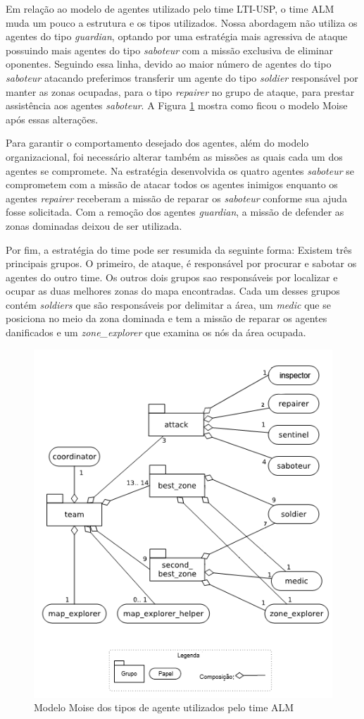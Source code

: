 \documentclass{llncs}
\begin{document}
Em relação ao modelo de agentes utilizado pelo time LTI-USP, o time ALM muda um pouco a estrutura e os tipos utilizados. Nossa abordagem não utiliza os agentes do tipo \textit{guardian}, optando por uma estratégia mais agressiva de ataque possuindo mais agentes do tipo \textit{saboteur} com a missão exclusiva de eliminar oponentes. Seguindo essa linha, devido ao maior número de agentes do tipo \textit{saboteur} atacando preferimos transferir um agente do tipo \textit{soldier} responsável por manter as zonas ocupadas, para o tipo \textit{repairer} no grupo de ataque, para prestar assistência aos agentes \textit{saboteur}. A Figura \ref{fig:fig2} mostra como ficou o modelo Moise após essas alterações.

Para garantir o comportamento desejado dos agentes, além do modelo organizacional, foi necessário alterar também as missões as quais cada um dos agentes se compromete. Na estratégia desenvolvida os quatro agentes \textit{saboteur} se comprometem com a missão de atacar todos os agentes inimigos enquanto os agentes \textit{repairer} receberam a missão de reparar os \textit{saboteur} conforme sua ajuda fosse solicitada. Com a remoção dos agentes \textit{guardian}, a missão de defender as zonas dominadas deixou de ser utilizada.

Por fim, a estratégia do time pode ser resumida da seguinte forma: Existem três principais grupos. O primeiro, de ataque, é responsável por procurar e sabotar os agentes do outro time. Os outros dois grupos sao responsáveis por localizar e ocupar as duas melhores zonas do mapa encontradas. Cada um desses grupos contém \textit{soldiers} que são responsáveis por delimitar a área, um \textit{medic} que se posiciona no meio da zona dominada e tem a missão de reparar os agentes danificados e um \textit{zone\_explorer} que examina os nós da área ocupada.

\begin{figure}[!ht]
\centering
\includegraphics[width=0.7\linewidth]{./images/fig2.png}
\caption{Modelo Moise dos tipos de agente utilizados pelo time ALM}
\label{fig:fig2}
\end{figure}
\end{document}
